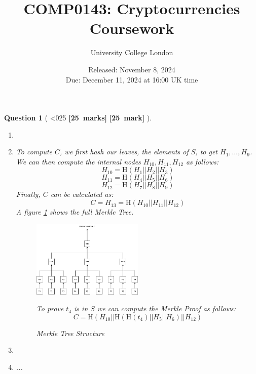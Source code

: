 \documentclass[a4paper]{article}
\theoremstyle{que}
\newtheorem{question}{Question}
\newcommand{\fixoffset}{\mbox{}\vspace*{-\bigskipamount}\vspace*{-\medskipamount}}
\newcommand\points[1]{%
\ifnum1<0#1\relax%
    {\bf \small [#1~marks]}%
  \else%
    {\bf \small [#1~mark]}%
  \fi%
}%
\newcommand{\module}{COMP0143: Cryptocurrencies}
\newcommand{\university}{University College London}
\newcommand{\assessment}{Coursework}
\newcommand{\releaseDate}{November 8, 2024}
\newcommand{\dueDate}{December 11, 2024 at 16:00 UK time}
\begin{document}
\title{\module\\[0.25cm]\assessment}
\author{\university}
\date{Released: \releaseDate\\[0.25cm]Due: \dueDate}
\maketitle

\newpage


\begin{question}[\points{25}]
  \fixoffset
  \begin{enumerate}[label=(\alph*)]
    \item 
    \item[(i)] To compute \( C \), we first hash our leaves, the elements of \( S \), to get \( H_1, \ldots, H_9 \). We can then compute the internal nodes \( H_{10}, H_{11}, H_{12} \) as follows:
\[
H_{10} = \text{H}(H_1 || H_2 || H_3)
\]
\[
H_{11} = \text{H}(H_4 || H_5 || H_6)
\]
\[
H_{12} = \text{H}(H_7 || H_8 || H_9)
\]
Finally, \( C \) can be calculated as:
\[
C = H_{13} = \text{H}(H_{10} || H_{11} || H_{12})
\]
A figure \ref{fig:merkle_tree} shows the full Merkle Tree.
\begin{figure}[h!]
    \centering
    \includegraphics[width=0.5\textwidth]{Merkle Tree example.drawio.png} %
    \caption{Merkle Tree Structure}
    \label{fig:merkle_tree}
To prove \( t_4 \) is in \( S \) we can compute the Merkle Proof as follows:
\[
C = \text{H}(H_{10}||\text{H}(\text{H}(t_4)||H_5||H_6)||H_{12})
\]

\end{figure}
    \item[(ii)] 
    \item ...
  \end{enumerate}
\end{question}

\newpage

\end{document}
